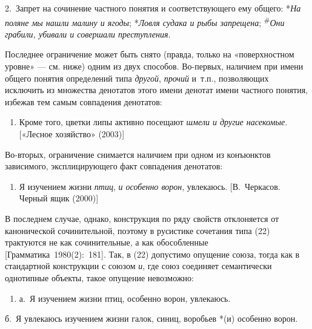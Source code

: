 2.~Запрет на сочинение частного понятия и соответствующего ему общего:
*\textit{На поляне мы нашли малину и ягоды}; *\textit{Ловля судака и рыбы
  запрещена}; \textsuperscript{\#}\textit{Они грабили, убивали и совершали
  преступления}.

Последнее ограничение может быть снято (правда, только на «поверхностном
уровне» --- см. ниже) одним из двух способов. Во-первых, наличием при
имени общего понятия определений типа \textit{другой}, \textit{прочий}
и~т.п., позволяющих исключить из множества денотатов этого имени денотат
имени частного понятия, избежав тем самым совпадения денотатов:

\begin{enumerate}
  \def\labelenumi{(\arabic{enumi})}
  \setcounter{enumi}{20}
  \item
        Кроме того, цветки липы активно посещают \textit{шмели и другие
          насекомые}. {[}«Лесное хозяйство» (2003){]}
\end{enumerate}

Во-вторых, ограничение снимается наличием при одном из конъюнктов
зависимого, эксплицирующего факт совпадения денотатов:

\begin{enumerate}
  \def\labelenumi{(\arabic{enumi})}
  \setcounter{enumi}{21}
  \item
        Я изучением жизни \textit{птиц}, \textit{и особенно ворон}, увлекаюсь.
        {[}В.~Черкасов. Черный ящик (2000){]}
\end{enumerate}

В последнем случае, однако, конструкция по ряду свойств отклоняется от
канонической сочинительной, поэтому в русистике сочетания типа (22)
трактуются не как сочинительные, а как обособленные
{[}Грамматика~1980(2):~181{]}. Так, в (22) допустимо опущение союза,
тогда как в стандартной конструкции с союзом \textit{и}, где союз
соединяет семантически однотипные объекты, такое опущение невозможно:

\begin{enumerate}
  \def\labelenumi{(\arabic{enumi})}
  \setcounter{enumi}{22}
  \item
        а.~Я изучением жизни птиц, особенно ворон, увлекаюсь.
\end{enumerate}

б.~Я увлекаюсь изучением жизни галок, синиц, воробьев *(и) особенно
ворон.

